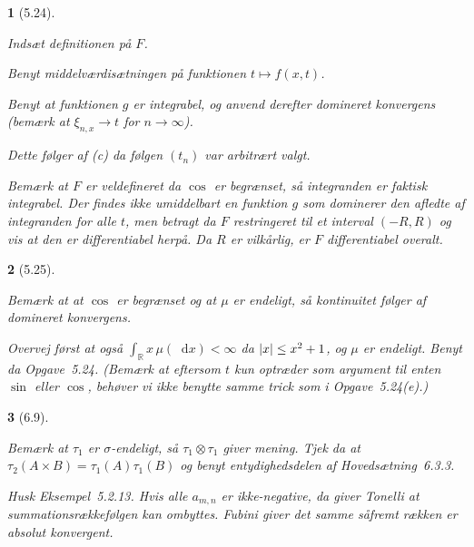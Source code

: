 \documentclass[a4paper, 11pt, article, danish, oneside]{memoir}
\newcommand{\reals}{\mathbb{R}}
\newcommand{\blank}{\mathrel{\;\cdot\;}}
\newcommand{\blankifempty}[1]{\ifstrempty{#1}{\blank}{#1}}
\DeclarePairedDelimiter{\auxdelimlvert}{\lvert}{\rvert}
\newcommand{\abs}[2][]{\auxdelimlvert[#1]{\blankifempty{#2}}}
\newcommand{\dif}{\mathop{}\!\mathrm{d}}
\newcommand{\pencilsymbol}{\raisebox{-2pt}{\normalfont\PencilLeft}}
\theoremstyle{changedotcustomnumber}
\theoremstyle{changedotbreakcustomnumber}
\newtheorem{opgavebreak}{\pencilsymbol}
\begin{document}
\begin{opgavebreak}[5.24]
\begin{solutionsec}
    \item Indsæt definitionen på $F$.
    
    \item Benyt middelværdisætningen på funktionen $t \mapsto f(x,t)$.

    \item Benyt at funktionen $g$ er integrabel, og anvend derefter domineret konvergens (bemærk at $\xi_{n,x} \to t$ for $n \to \infty$).

    \item Dette følger af (c) da følgen $(t_n)$ var arbitrært valgt.

    \item Bemærk at $F$ er veldefineret da $\cos$ er begrænset, så integranden er faktisk integrabel. Der findes ikke umiddelbart en funktion $g$ som dominerer den afledte af integranden for alle $t$, men betragt da $F$ restringeret til et interval $(-R,R)$ og vis at den er differentiabel herpå. Da $R$ er vilkårlig, er $F$ differentiabel overalt.
\end{solutionsec}
\end{opgavebreak}


\begin{opgavebreak}[5.25]
\begin{solutionsec}
    \item Bemærk at at $\cos$ er begrænset og at $\mu$ er endeligt, så kontinuitet følger af domineret konvergens.
    
    \item Overvej først at også $\int_\reals x \,\mu(\dif x) < \infty$ da $\abs{x} \leq x^2 + 1$, og $\mu$ er endeligt. Benyt da Opgave~5.24. (Bemærk at eftersom $t$ kun optræder som argument til enten $\sin$ eller $\cos$, behøver vi ikke benytte samme trick som i Opgave~5.24(e).)
\end{solutionsec}
\end{opgavebreak}


\begin{opgavebreak}[6.9]
\begin{solutionsec}
    \item Bemærk at $\tau_1$ er $\sigma$-endeligt, så $\tau_1 \otimes \tau_1$ giver mening. Tjek da at $\tau_2(A \times B) = \tau_1(A) \tau_1(B)$ og benyt entydighedsdelen af Hovedsætning~6.3.3.

    \item Husk Eksempel~5.2.13. Hvis alle $a_{m,n}$ er ikke-negative, da giver Tonelli at summationsrækkefølgen kan ombyttes. Fubini giver det samme såfremt rækken er absolut konvergent.
\end{solutionsec}
\end{opgavebreak}
\end{document}
